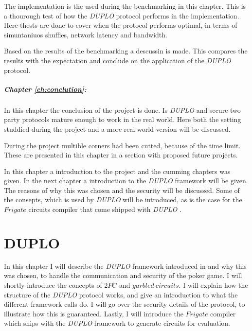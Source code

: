 \documentclass[twoside,11pt,openright]{report}
\newcommand{\DUPLO}{\textit{DUPLO} }
\begin{document}
The implementation is the used during the benchmarking in this chapter. This is a thourough test of how the \DUPLO protocol performs in the implementation. Here thests are done to cover when the protocol performs optimal, in terms of simuntaniuos shuffles, network latency and bandwidth.

Based on the results of the benchmarking a descussin is made. This compares the results with the expectation and conclude on the application of the \DUPLO protocol.


\paragraph{Chapter \ref{ch:conclution}:}
In this chapter the conclusion of the project is done. Is \DUPLO and secure two party protocols mature enough to work in the real world. Here both the setting studdied during the project and a more real world version will be discussed. 

During the project multible corners had been cutted, because of the time limit. These are presented in this chapter in a section with proposed future projects.

\bigskip

In this chapter a introduction to the project and the cumming chapters was given. In the next chapter a introduction to the \DUPLO framework will be given. The reasons of why this was chosen and the security will be discussed. Some of the consepts, which is used by \DUPLO will be introduced, as is the case for the $Frigate$ circuits compiler that come shipped with \DUPLO.

\chapter{DUPLO}
\label{ch:duplo}

In this chapter I will describe the \DUPLO framework introduced in \cite{duplo} and why this was chosen, to handle the communication and security of the poker game. I will shortly introduce the concepts of $2PC$ and $garbled~circuits$. I will explain how the structure of the \DUPLO protocol works, and give an introduction to what the different framework calls do. I will go over the security details of the protocol, to illustrate how this is guaranteed. Lastly, I will introduce the $Frigate$ compiler which ships with the \DUPLO framework to generate circuits for evaluation.
\end{document}
